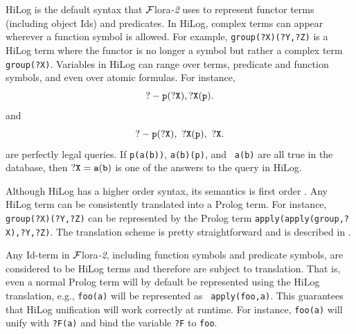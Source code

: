 \documentclass[11pt]{article}
\newcommand{\FLSYSTEM}{{\mbox{\sc ${\cal F}${lora}\rm\emph{-2}}}\xspace}
\begin{document}
%
HiLog \cite{hilog-jlp} is the default syntax that \FLSYSTEM uses to
represent functor terms (including object Ids) and predicates.  In
HiLog, complex terms can appear wherever a function symbol is
allowed. For example, {\tt group(?X)(?Y,?Z)} is a HiLog term where the
functor is no longer a symbol but rather a complex term {\tt
group(?X)}. Variables in HiLog can range over terms, predicate and
function symbols, and even over atomic formulas. For instance,
\[
{\tt
 ?- p(?X), ?X(p).
}
\]
\noindent
and
\begin{equation}\label{eq-hilog-notallowed}
{\tt
 ?- p(?X), ~?X(p), ~?X.  
}
\end{equation}
\noindent
are perfectly legal queries. If {\tt p(a(b))}, {\tt a(b)(p)}, and {\tt
a(b)} are all true in the database, then $\tt ?X=a(b)$ is one of the answers
to the query in HiLog.


%
Although HiLog has a higher order syntax, its semantics is first order
\cite{hilog-jlp}. Any HiLog term can be consistently translated into a
Prolog term. For instance, {\tt group(?X)(?Y,?Z)} can be represented by the
Prolog term {\tt apply(apply(group,?X),?Y,?Z)}. The translation scheme is
pretty straightforward and is described in \cite{hilog-jlp}.

Any Id-term in \FLSYSTEM, including function symbols and predicate symbols,
are considered to be HiLog terms and therefore are subject to translation.
That is, even a normal Prolog term will by default be represented using the
HiLog translation, e.g., {\tt foo(a)} will be represented as {\tt
  apply(foo,a)}. This guarantees that HiLog unification will work correctly
at runtime. For instance, {\tt foo(a)} will unify with {\tt ?F(a)} and bind
the variable {\tt ?F} to {\tt foo}.
\end{document}
